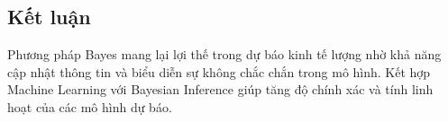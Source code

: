 \subsection{Kết luận}
Phương pháp Bayes mang lại lợi thế trong dự báo kinh tế lượng nhờ khả năng cập nhật thông tin và biểu diễn sự không chắc chắn trong mô hình. Kết hợp Machine Learning với Bayesian Inference giúp tăng độ chính xác và tính linh hoạt của các mô hình dự báo.